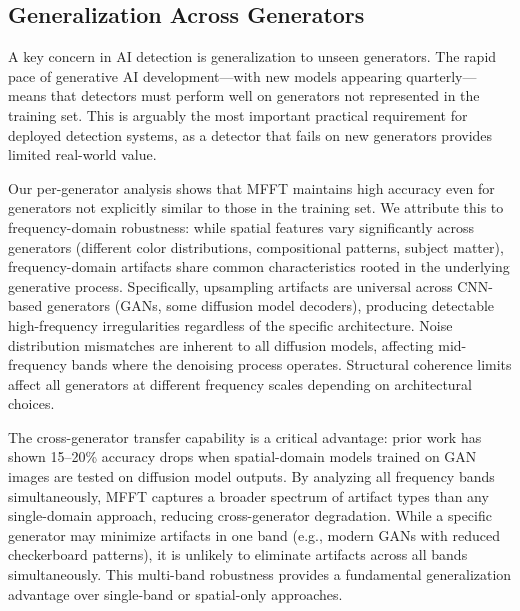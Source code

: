 \documentclass[journal]{IEEEtran}
\begin{document}
\subsection{Generalization Across Generators}
A key concern in AI detection is generalization to unseen generators. The rapid pace of generative AI development---with new models appearing quarterly---means that detectors must perform well on generators not represented in the training set. This is arguably the most important practical requirement for deployed detection systems, as a detector that fails on new generators provides limited real-world value.

Our per-generator analysis shows that MFFT maintains high accuracy even for generators not explicitly similar to those in the training set. We attribute this to frequency-domain robustness: while spatial features vary significantly across generators (different color distributions, compositional patterns, subject matter), frequency-domain artifacts share common characteristics rooted in the underlying generative process. Specifically, upsampling artifacts are universal across CNN-based generators (GANs, some diffusion model decoders), producing detectable high-frequency irregularities regardless of the specific architecture. Noise distribution mismatches are inherent to all diffusion models, affecting mid-frequency bands where the denoising process operates. Structural coherence limits affect all generators at different frequency scales depending on architectural choices.

The cross-generator transfer capability is a critical advantage: prior work has shown 15--20\% accuracy drops when spatial-domain models trained on GAN images are tested on diffusion model outputs. By analyzing all frequency bands simultaneously, MFFT captures a broader spectrum of artifact types than any single-domain approach, reducing cross-generator degradation. While a specific generator may minimize artifacts in one band (e.g., modern GANs with reduced checkerboard patterns), it is unlikely to eliminate artifacts across all bands simultaneously. This multi-band robustness provides a fundamental generalization advantage over single-band or spatial-only approaches.
\end{document}
